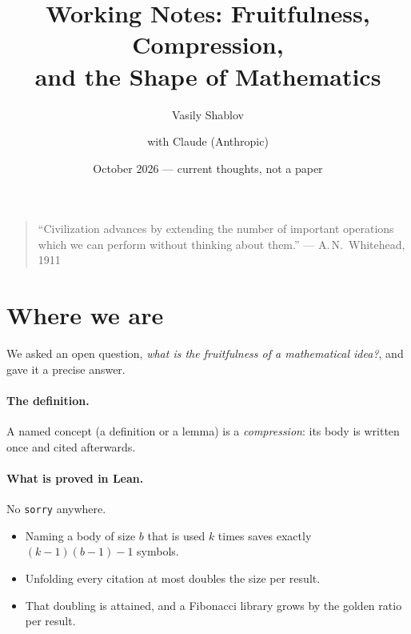 \documentclass[11pt]{article}
\title{Working Notes: Fruitfulness, Compression,\\and the Shape of Mathematics}
\author{Vasily Shablov \and with Claude (Anthropic)}
\date{October 2026 --- current thoughts, not a paper}
\begin{document}
\maketitle

\begin{quote}\small
``Civilization advances by extending the number of important operations which we can
perform without thinking about them.'' \hfill --- A.\,N.~Whitehead, 1911
\end{quote}

\section{Where we are}

We asked an open question, \emph{what is the fruitfulness of a mathematical idea?}, and gave
it a precise answer.

\paragraph{The definition.} A named concept (a definition or a lemma) is a
\emph{compression}: its body is written once and cited afterwards.

\paragraph{What is proved in Lean.} No \texttt{sorry} anywhere.
\begin{itemize}
\item Naming a body of size $b$ that is used $k$ times saves exactly $(k-1)(b-1)-1$ symbols.
\item Unfolding every citation at most doubles the size per result.
\item That doubling is attained, and a Fibonacci library grows by the golden ratio per result.
\end{itemize}
\end{document}
